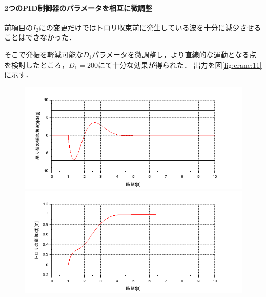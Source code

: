 \documentclass[dvipdfmx,titlepage,a4j]{jsarticle}  %
\begin{document}
\paragraph{2つのPID制御器のパラメータを相互に微調整\\}
前項目の$I_2$にの変更だけではトロリ収束前に発生している波を十分に減少させることはできなかった．

そこで発振を軽減可能な$D_1$パラメータを微調整し，より直線的な運動となる点を検討したところ，$D_1 = 200$にて十分な効果が得られた．
出力を図\ref{fig:crane:11}に示す．

\begin{figure}[H]
  \begin{minipage}{4.5cm}
    \centering
    \includegraphics[keepaspectratio, scale=0.35]{../graph/crane/ang-P1-300-I1-0-D1-200-P2-1000-I2-1500-D2-0.png}
  \end{minipage}
  \hfill
  \begin{minipage}{4.5cm}
    \centering
    \includegraphics[keepaspectratio, scale=0.35]{../graph/crane/po-P1-300-I1-0-D1-200-P2-1000-I2-1500-D2-0.png}
  \end{minipage}
  \hfill
  \begin{minipage}{3cm}
    \begin{center}

\end{center}
\end{minipage}
\end{figure}
\end{document}

